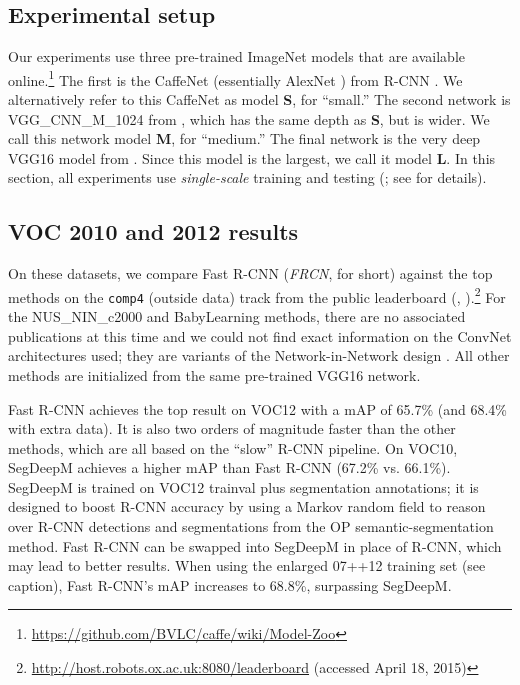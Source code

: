 \documentclass[10pt,twocolumn,letterpaper]{article}
\newcommand{\vggsixteen}{VGG16\xspace}
\newcommand{\Sm}{{\bf S}\xspace}
\newcommand{\Med}{{\bf M}\xspace}
\newcommand{\Lg}{{\bf L}\xspace}
\begin{document}
\subsection{Experimental setup}
Our experiments use three pre-trained ImageNet models that are available online.\footnote{\url{https://github.com/BVLC/caffe/wiki/Model-Zoo}}
The first is the CaffeNet (essentially AlexNet \cite{krizhevsky2012imagenet}) from R-CNN \cite{girshick2014rcnn}.
We alternatively refer to this CaffeNet as model \Sm, for ``small.''
The second network is VGG\_CNN\_M\_1024 from \cite{Chatfield14}, which has the same depth as \Sm, but is wider.
We call this network model \Med, for ``medium.''
The final network is the very deep \vggsixteen model from \cite{simonyan2015verydeep}.
Since this model is the largest, we call it model \Lg.
In this section, all experiments use \emph{single-scale} training and testing (; see  for details).

\subsection{VOC 2010 and 2012 results}
On these datasets, we compare Fast R-CNN (\emph{FRCN}, for short) against the top methods on the \texttt{comp4} (outside data) track from the public leaderboard (, ).\footnote{\url{http://host.robots.ox.ac.uk:8080/leaderboard} (accessed April 18, 2015)}
For the NUS\_NIN\_c2000 and BabyLearning methods, there are no associated publications at this time and we could not find exact information on the ConvNet architectures used; they are variants of the Network-in-Network design \cite{Lin2014NiN}.
All other methods are initialized from the same pre-trained \vggsixteen network.


Fast R-CNN achieves the top result on VOC12 with a mAP of 65.7\% (and 68.4\% with extra data).
It is also two orders of magnitude faster than the other methods, which are all based on the ``slow'' R-CNN pipeline.
On VOC10, SegDeepM \cite{Zhu2015segDeepM} achieves a higher mAP than Fast R-CNN (67.2\% vs. 66.1\%).
SegDeepM is trained on VOC12 trainval plus segmentation annotations; it is designed to boost R-CNN accuracy by using a Markov random field to reason over R-CNN detections and segmentations from the OP \cite{o2p} semantic-segmentation method.
Fast R-CNN can be swapped into SegDeepM in place of R-CNN, which may lead to better results.
When using the enlarged 07++12 training set (see  caption), Fast R-CNN's mAP increases to 68.8\%, surpassing SegDeepM.
\end{document}
